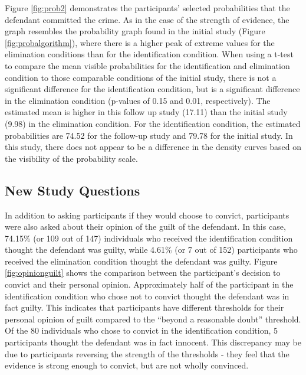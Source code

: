 \documentclass[print]{nuthesis}
\begin{document}
Figure \ref{fig:prob2} demonstrates the participants' selected probabilities that the defendant committed the crime.
As in the case of the strength of evidence, the graph resembles the probability graph found in the initial study (Figure \ref{fig:probalgorithm}), where there is a higher peak of extreme values for the elimination conditions than for the identification condition.
When using a t-test to compare the mean visible probabilities for the identification and elimination condition to those comparable conditions of the initial study, there is not a significant difference for the identification condition, but is a significant difference in the elimination condition (p-values of 0.15 and 0.01, respectively).
The estimated mean is higher in this follow up study (17.11) than the initial study (9.98) in the elimination condition.
For the identification condition, the estimated probabilities are 74.52 for the follow-up study and 79.78 for the initial study.
In this study, there does not appear to be a difference in the density curves based on the visibility of the probability scale.

\hypertarget{new-study-questions}{%
\subsection{New Study Questions}\label{new-study-questions}}

In addition to asking participants if they would choose to convict, participants were also asked about their opinion of the guilt of the defendant.
In this case, 74.15\% (or 109 out of 147) individuals who received the identification condition thought the defendant was guilty, while 4.61\% (or 7 out of 152) participants who received the elimination condition thought the defendant was guilty.
Figure \ref{fig:opinionguilt} shows the comparison between the participant's decision to convict and their personal opinion.
Approximately half of the participant in the identification condition who chose not to convict thought the defendant was in fact guilty.
This indicates that participants have different thresholds for their personal opinion of guilt compared to the ``beyond a reasonable doubt'' threshold.
Of the 80 individuals who chose to convict in the identification condition, 5 participants thought the defendant was in fact innocent.
This discrepancy may be due to participants reversing the strength of the thresholds - they feel that the evidence is strong enough to convict, but are not wholly convinced.
\end{document}
